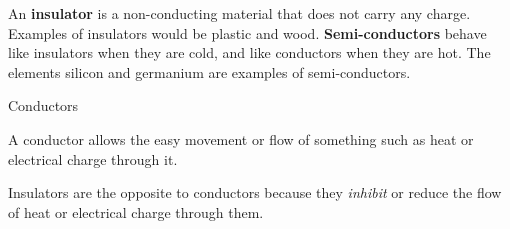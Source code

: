       \label{m38706*id66098}An \textbf{insulator} is a non-conducting material that does not carry any charge. Examples of insulators would be plastic and wood. \textbf{Semi-conductors} behave like insulators when they are cold, and like conductors when they are hot. The elements silicon and germanium are examples of semi-conductors.\par 
\Definition
{Conductors} 
{A conductor allows the easy movement or flow of something such as heat or electrical charge through it.  \par 
       } 
{Insulators are the opposite to conductors because they \textsl{inhibit} or reduce the flow of heat or electrical charge through them. \par}

